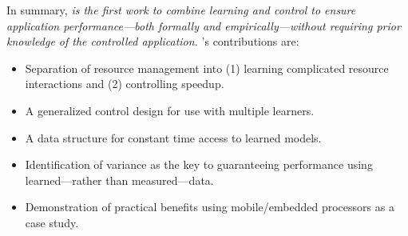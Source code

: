 In summary, \emph{\SYSTEM{} is the first work to combine learning and
  control to ensure application performance---both formally and
  empirically---without requiring prior knowledge of the controlled
  application.}  \SYSTEM{}'s contributions are:
\begin{itemize}[leftmargin=1em]
\item Separation of resource management into (1) learning complicated
  resource interactions and (2) controlling speedup.
\item A generalized control design for use with multiple learners.
\item A data structure for constant time access to learned models.
\item Identification of variance as the key to guaranteeing
  performance using learned---rather than measured---data.
\item Demonstration of practical benefits using mobile/embedded
  processors as a case study.
\end{itemize}





